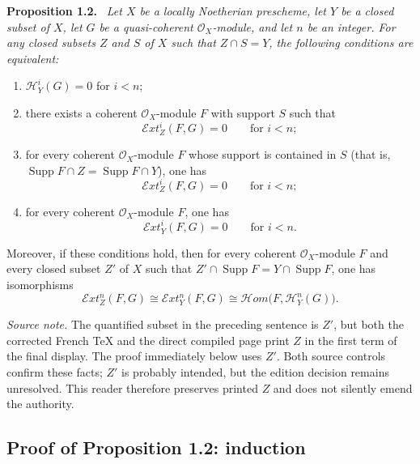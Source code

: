 \documentclass[11pt,a4paper]{article}
\newcommand{\OX}{\mathcal O_X}
\newcommand{\SheafExt}{\mathcal E\!xt}
\newcommand{\SheafHom}{\mathcal H\!om}
\newcommand{\SheafH}{\mathcal H}
\newcommand{\Supp}{\operatorname{Supp}}
\newenvironment{sgastatement}[1]{\par\addvspace{0.8\baselineskip}\noindent\textbf{#1.}\ \itshape}{\par}
\begin{document}
\begin{sgastatement}{Proposition 1.2}
Let $X$ be a locally Noetherian prescheme, let $Y$ be a closed subset of $X$,
let $G$ be a quasi-coherent $\OX$-module, and let $n$ be an integer. For any
closed subsets $Z$ and $S$ of $X$ such that $Z\cap S=Y$, the following
conditions are equivalent:
\begin{enumerate}
  \renewcommand{\labelenumi}{(\roman{enumi})}
  \item $\SheafH_Y^i(G)=0$ for $i<n$;
  \item there exists a coherent $\OX$-module $F$ with support $S$ such that
  \[
    \SheafExt_Z^i(F,G)=0\qquad\text{for }i<n;
  \]
  \item for every coherent $\OX$-module $F$ whose support is contained in $S$
  (that is, $\Supp F\cap Z=\Supp F\cap Y$), one has
  \[
    \SheafExt_Z^i(F,G)=0\qquad\text{for }i<n;
  \]
  \item for every coherent $\OX$-module $F$, one has
  \[
    \SheafExt_Y^i(F,G)=0\qquad\text{for }i<n.
  \]
\end{enumerate}
Moreover, if these conditions hold, then for every coherent $\OX$-module $F$
and every closed subset $Z'$ of $X$ such that
$Z'\cap\Supp F=Y\cap\Supp F$, one has isomorphisms
\[
  \SheafExt_Z^n(F,G)\cong
  \SheafExt_Y^n(F,G)\cong
  \SheafHom\bigl(F,\SheafH_Y^n(G)\bigr).
\]
\end{sgastatement}

\noindent\textit{Source note.} The quantified subset in the preceding
sentence is $Z'$, but both the corrected French TeX and the direct compiled
page print $Z$ in the first term of the final display. The proof immediately
below uses $Z'$. Both source controls confirm these facts; $Z'$ is probably
intended, but the edition decision remains unresolved. This reader therefore
preserves printed $Z$ and does not silently emend the authority.

\subsection*{Proof of Proposition 1.2: induction}
\end{document}
